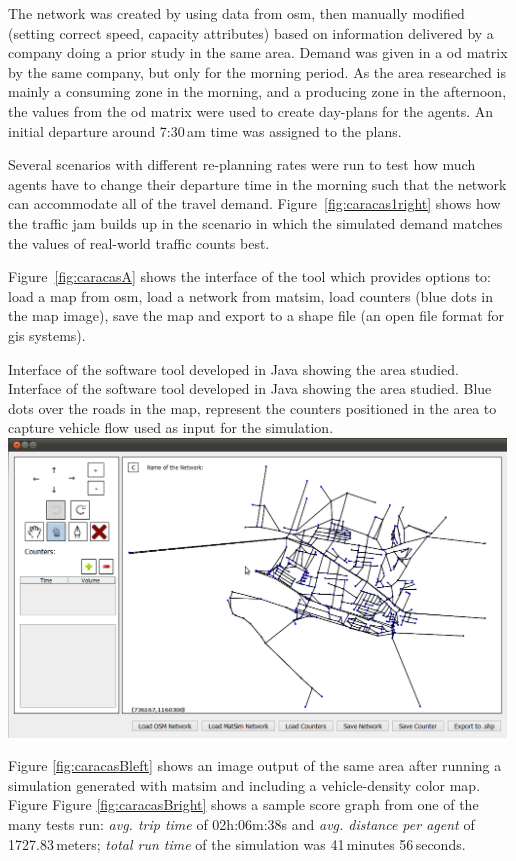 The network was created by using data from \gls{osm}, then manually modified (\ie setting correct speed, capacity attributes) based on information delivered by a company doing a prior study in the same area. Demand was given in a \gls{od} matrix by the same company, but only for the morning period. As the area researched is mainly a consuming zone in the morning, and a producing zone in the afternoon, the values from the \gls{od} matrix were used to create day-plans for the agents. An initial departure around 7:30\,am time was assigned to the plans.

Several scenarios with different re-planning rates were run to test how much agents have to change their departure time in the morning such that the network can accommodate all of the travel demand. Figure~\ref{fig:caracas1right} shows how the traffic jam builds up in the scenario in which the simulated demand matches the values of real-world traffic counts best.

Figure~\ref{fig:caracasA} shows the interface of the tool which provides options to: load a map from \gls{osm}, load a network from \gls{matsim}, load counters (blue dots in the map image), save the map and export to a shape file (an open file format for \gls{gis} systems).

\createfigure%
{Interface of the software tool developed in Java showing the area studied.}%
{Interface of the software tool developed in Java showing the area studied. Blue dots over the roads in the map, represent the counters positioned in the area to capture vehicle flow used as input for the simulation.}%
{\label{fig:caracasA}}%
{\includegraphics[width=0.99\textwidth, angle=0]{./scenarios/figures/caracasA.png}}%
{}

Figure \ref{fig:caracasBleft} shows an image output of the same area after running a simulation generated with \gls{matsim} and including a vehicle-density color map. Figure Figure \ref{fig:caracasBright} shows a sample score graph from one of the many tests run: \textit{avg. trip time} of 02h:06m:38s and \emph{avg. distance per agent} of 1727.83\,meters; \textit{total run time} of the simulation was 41\,minutes 56\,seconds.

